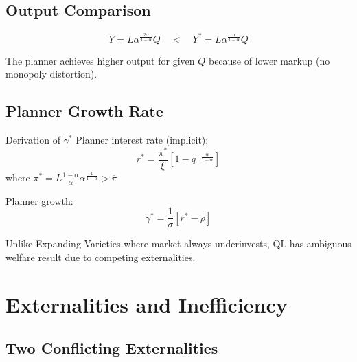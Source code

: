 \documentclass[a4paper,11pt]{article}
\begin{document}
\subsection*{Output Comparison}
\begin{resultbox}
\[
Y = L\alpha^{\frac{2\alpha}{1-\alpha}} Q \quad < \quad Y^* = L\alpha^{\frac{\alpha}{1-\alpha}} Q
\tag{Output Comparison}
\]
\end{resultbox}

The planner achieves higher output for given $Q$ because of lower markup (no monopoly distortion).

\subsection*{Planner Growth Rate}
\begin{derivationbox}{Derivation of $\gamma^*$}
Planner interest rate (implicit):
\[
r^* = \frac{\pi^*}{\xi}\left[1 - q^{-\frac{\alpha}{1-\alpha}}\right]
\]
where $\pi^* = L\frac{1-\alpha}{\alpha}\alpha^{\frac{1}{1-\alpha}} > \overline{\pi}$

Planner growth:
\[
\gamma^* = \frac{1}{\sigma}\left[r^* - \rho\right]
\]
\end{derivationbox}


\begin{warningbox}
Unlike Expanding Varieties where market always underinvests, QL has ambiguous welfare result due to competing externalities.
\end{warningbox}

\clearpage

\section{Externalities and Inefficiency}

\subsection*{Two Conflicting Externalities}
\end{document}
